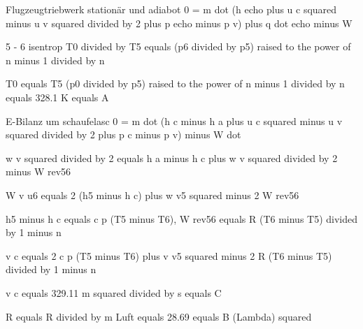 Flugzeugtriebwerk stationär und adiabot
0 = m dot (h echo plus u c squared minus u v squared divided by 2 plus p echo minus p v) plus q dot echo minus W

5 - 6 isentrop
T0 divided by T5 equals (p6 divided by p5) raised to the power of n minus 1 divided by n

T0 equals T5 (p0 divided by p5) raised to the power of n minus 1 divided by n equals 328.1 K equals A

E-Bilanz um schaufelasc
0 = m dot (h c minus h a plus u c squared minus u v squared divided by 2 plus p c minus p v) minus W dot

w v squared divided by 2 equals h a minus h c plus w v squared divided by 2 minus W rev56

W v u6 equals 2 (h5 minus h c) plus w v5 squared minus 2 W rev56

h5 minus h c equals c p (T5 minus T6), W rev56 equals R (T6 minus T5) divided by 1 minus n

v c equals 2 c p (T5 minus T6) plus v v5 squared minus 2 R (T6 minus T5) divided by 1 minus n

v c equals 329.11 m squared divided by s equals C

R equals R divided by m Luft equals 28.69 equals B (Lambda) squared